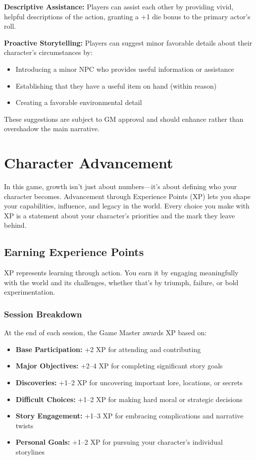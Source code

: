 \documentclass[11pt,twoside,openany]{book}
\begin{document}
\textbf{Descriptive Assistance:} Players can assist each other by providing vivid, helpful descriptions of the action, granting a +1 die bonus to the primary actor's roll.

\textbf{Proactive Storytelling:} Players can suggest minor favorable details about their character's circumstances by:
\begin{itemize}
\item Introducing a minor NPC who provides useful information or assistance
\item Establishing that they have a useful item on hand (within reason)
\item Creating a favorable environmental detail
\end{itemize}

These suggestions are subject to GM approval and should enhance rather than overshadow the main narrative.

\chapter{Character Advancement} \label{ch:advancement}

In this game, growth isn't just about numbers—it's about defining who your character becomes. Advancement through Experience Points (XP) lets you shape your capabilities, influence, and legacy in the world. Every choice you make with XP is a statement about your character's priorities and the mark they leave behind.

\section*{Earning Experience Points} 

XP represents learning through action. You earn it by engaging meaningfully with the world and its challenges, whether that's by triumph, failure, or bold experimentation.

\subsection*{Session Breakdown}

At the end of each session, the Game Master awards XP based on:
\begin{itemize}
\item \textbf{Base Participation:} +2 XP for attending and contributing
\item \textbf{Major Objectives:} +2–4 XP for completing significant story goals
\item \textbf{Discoveries:} +1–2 XP for uncovering important lore, locations, or secrets
\item \textbf{Difficult Choices:} +1–2 XP for making hard moral or strategic decisions
\item \textbf{Story Engagement:} +1–3 XP for embracing complications and narrative twists
\item \textbf{Personal Goals:} +1–2 XP for pursuing your character's individual storylines
\end{itemize}
\end{document}
